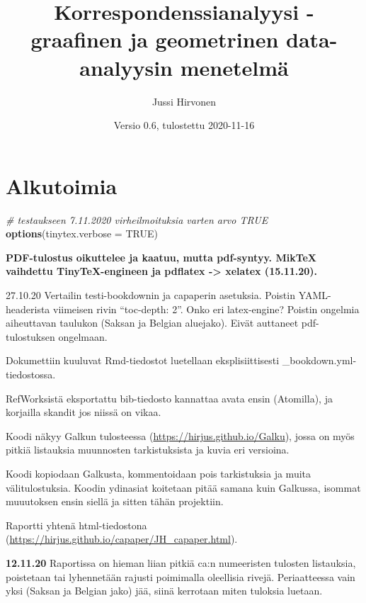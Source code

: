 \documentclass[
  finnish,
]{book}
\title{Korrespondenssianalyysi - graafinen ja geometrinen data-analyysin menetelmä}
\author{Jussi Hirvonen}
\date{Versio 0.6, tulostettu 2020-11-16}
\newenvironment{Shaded}{\begin{snugshade}}{\end{snugshade}}
\newcommand{\CommentTok}[1]{\textcolor[rgb]{0.56,0.35,0.01}{\textit{#1}}}
\newcommand{\DataTypeTok}[1]{\textcolor[rgb]{0.13,0.29,0.53}{#1}}
\newcommand{\KeywordTok}[1]{\textcolor[rgb]{0.13,0.29,0.53}{\textbf{#1}}}
\newcommand{\NormalTok}[1]{#1}
\newcommand{\OtherTok}[1]{\textcolor[rgb]{0.56,0.35,0.01}{#1}}
\begin{document}
\maketitle

{
\setcounter{tocdepth}{1}
\tableofcontents
}
\hypertarget{alkutoimia}{%
\chapter*{Alkutoimia}\label{alkutoimia}}

\begin{Shaded}
\begin{Highlighting}[]
\CommentTok{# testaukseen 7.11.2020 virheilmoituksia varten arvo TRUE}
\KeywordTok{options}\NormalTok{(}\DataTypeTok{tinytex.verbose =} \OtherTok{TRUE}\NormalTok{)}
\end{Highlighting}
\end{Shaded}

\textbf{PDF-tulostus oikuttelee ja kaatuu, mutta pdf-syntyy. MikTeX vaihdettu TinyTeX-engineen ja pdflatex -\textgreater{} xelatex (15.11.20).}

27.10.20 Vertailin testi-bookdownin ja capaperin asetuksia.
Poistin YAML-headerista viimeisen rivin ``toc-depth: 2''. Onko eri latex-engine?
Poistin ongelmia aiheuttavan taulukon (Saksan ja Belgian aluejako).
Eivät auttaneet pdf-tulostuksen ongelmaan.

Dokumettiin kuuluvat Rmd-tiedostot luetellaan eksplisiittisesti
\_bookdown.yml-tiedostossa.

RefWorksistä eksportattu bib-tiedosto kannattaa avata ensin (Atomilla),
ja korjailla skandit jos niissä on vikaa.

Koodi näkyy Galkun tulosteessa (\url{https://hirjus.github.io/Galku}), jossa on myös
pitkiä listauksia muunnosten tarkistuksista ja kuvia eri versioina.

Koodi kopiodaan Galkusta, kommentoidaan pois tarkistuksia ja muita välitulostuksia.
Koodin ydinasiat koitetaan pitää samana kuin Galkussa, isommat muuutoksen ensin siellä
ja sitten tähän projektiin.

Raportti yhtenä html-tiedostona (\url{https://hirjus.github.io/capaper/JH_capaper.html}).

\textbf{12.11.20}
Raportissa on hieman liian pitkiä ca:n numeeristen tulosten listauksia, poistetaan tai
lyhennetään rajusti poimimalla oleellisia rivejä. Periaatteessa vain yksi (Saksan ja Belgian jako)
jää, siinä kerrotaan miten tuloksia luetaan.
\end{document}
